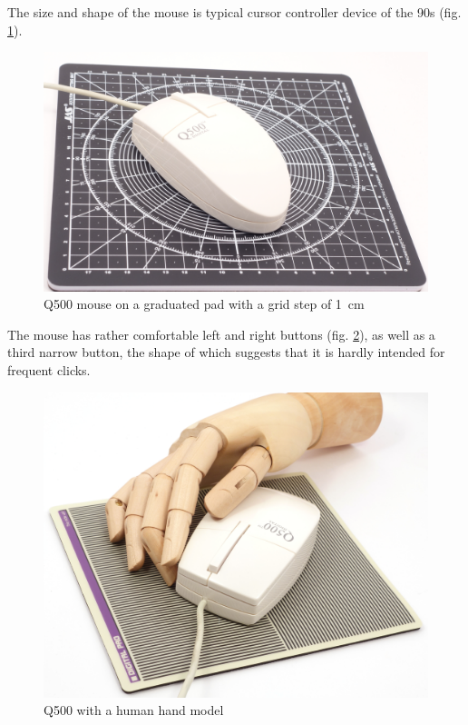 \documentclass[11pt, a4paper]{article}
\begin{document}
The size and shape of the mouse is typical cursor controller device of the 90s (fig. \ref{fig:q500mouseSize}).

\begin{figure}[h]
    \centering
    \includegraphics[scale=0.25]{1996_q500_mouse/size.jpg}
    \caption{Q500 mouse on a graduated pad with a grid step of 1~cm}
    \label{fig:q500mouseSize}
\end{figure}

The mouse has rather comfortable left and right buttons (fig. \ref{fig:q500mouseHand}), as well as a third narrow button, the shape of which suggests that it is hardly intended for frequent clicks.

\begin{figure}[h]
    \centering
    \includegraphics[scale=0.4]{1996_q500_mouse/hand_30.jpg}
    \caption{Q500 with a human hand model}
    \label{fig:q500mouseHand}
\end{figure}
\end{document}
